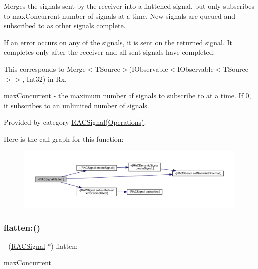 Merges the signals sent by the receiver into a flattened signal, but only subscribes to {\ttfamily max\+Concurrent} number of signals at a time. New signals are queued and subscribed to as other signals complete.

If an error occurs on any of the signals, it is sent on the returned signal. It completes only after the receiver and all sent signals have completed.

This corresponds to {\ttfamily Merge$<$T\+Source$>$(I\+Observable$<$I\+Observable$<$T\+Source$>$$>$, Int32)} in Rx.

max\+Concurrent -\/ the maximum number of signals to subscribe to at a time. If 0, it subscribes to an unlimited number of signals. 

Provided by category \mbox{\hyperlink{category_r_a_c_signal_07_operations_08_a72e5f2fd80960ee5422e08ceef0f4e2c}{R\+A\+C\+Signal(\+Operations)}}.

Here is the call graph for this function\+:\nopagebreak
\begin{figure}[H]
\begin{center}
\leavevmode
\includegraphics[width=350pt]{interface_r_a_c_signal_a72e5f2fd80960ee5422e08ceef0f4e2c_cgraph}
\end{center}
\end{figure}
\mbox{\label{interface_r_a_c_signal_a72e5f2fd80960ee5422e08ceef0f4e2c}} 
\subsubsection{\texorpdfstring{flatten\+:()}{flatten:()}\hspace{0.1cm}{\footnotesize\ttfamily [2/3]}}
{\footnotesize\ttfamily -\/ (\mbox{\hyperlink{interface_r_a_c_signal}{R\+A\+C\+Signal}} $\ast$) flatten\+: \begin{DoxyParamCaption}\item[{(N\+S\+U\+Integer)}]{max\+Concurrent }\end{DoxyParamCaption}}

